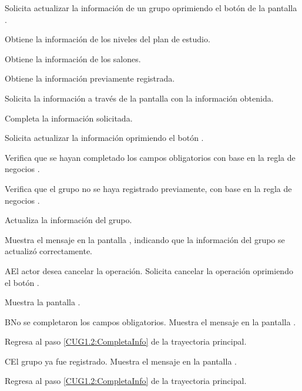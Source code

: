 \begin{UCtrayectoria}
	\UCpaso [\UCactor] Solicita actualizar la información de un grupo oprimiendo el botón  de la pantalla . 
	
	\UCpaso [\UCsist] Obtiene la información de los niveles del plan de estudio.	

	\UCpaso [\UCsist] Obtiene la información de los salones.
	
	\UCpaso [\UCsist] Obtiene la información previamente registrada.
		
	\UCpaso [\UCsist] Solicita la información a través de la pantalla  con la información obtenida.
	
	\UCpaso [\UCactor] Completa la información solicitada. \label{CUG1.2:CompletaInfo}
	
	\UCpaso [\UCactor] Solicita actualizar la información oprimiendo el botón . 
	
	\UCpaso [\UCsist] Verifica que se hayan completado los campos obligatorios con base en la regla de negocios . 
	
	\UCpaso [\UCsist] Verifica que el grupo no se haya registrado previamente, con base en la regla de negocios . 
	
	\UCpaso [\UCsist] Actualiza la información del grupo.
	
	\UCpaso [\UCsist] Muestra el mensaje  en la pantalla , indicando que la información del grupo se actualizó correctamente.	
	
\end{UCtrayectoria}


\begin{UCtrayectoriaA}{A}{El actor desea cancelar la operación.}
	\UCpaso [\UCactor] Solicita cancelar la operación oprimiendo el botón .
	
	\UCpaso [\UCsist] Muestra la pantalla . 
\end{UCtrayectoriaA}

\begin{UCtrayectoriaA}{B}{No se completaron los campos obligatorios.}
	\UCpaso [\UCsist] Muestra el mensaje  en la pantalla .
	
	\UCpaso Regresa al paso \ref{CUG1.2:CompletaInfo} de la trayectoria principal.
\end{UCtrayectoriaA}

\begin{UCtrayectoriaA}{C}{El grupo ya fue registrado.}
	\UCpaso [\UCsist] Muestra el mensaje  en la pantalla .
	
	\UCpaso Regresa al paso \ref{CUG1.2:CompletaInfo} de la trayectoria principal.
\end{UCtrayectoriaA}

